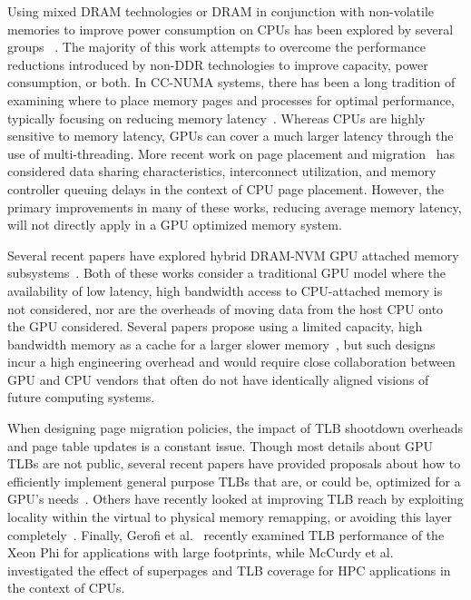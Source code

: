 Using mixed DRAM technologies or DRAM in conjunction with non-volatile memories
to improve power consumption on CPUs has been explored by several groups
~\cite{Kultursay2013,Phadke11mlpaware2011,Mogul2009,Bheda2011,Ramos2011}.
The majority of this work attempts to overcome the performance reductions introduced
by non-DDR technologies to improve capacity, power consumption, or both.
In CC-NUMA systems, there has been a long tradition of examining where to place
memory pages and processes for optimal performance, typically focusing on reducing
memory latency~\cite{Wilson2001,Bolosky1989,Brecht1993,LaRowe1992,Verghese1996,Iyer1998}.
Whereas CPUs are highly sensitive to memory latency, GPUs can cover a much larger latency
through the use of multi-threading.  More recent work on page placement and 
migration~\cite{AUTONUMA,Dashti2013,Tam2007,Zhuravlev2010,Knauerhase2008,Blagodurov2011,awasthinellans10}
has considered data sharing characteristics, interconnect utilization, and memory controller
queuing delays in the context of CPU page placement. However, the primary improvements in many of these works,
reducing average memory latency, will not directly apply in a GPU optimized memory system.

Several recent papers have explored hybrid DRAM-NVM GPU attached memory subsystems~\cite{zhao2013,Wang2013}.
Both of these works consider a traditional GPU model where the availability of low latency, high bandwidth access to CPU-attached 
memory is not considered, nor are the overheads of moving data from the host CPU onto the GPU considered.
Several papers propose using a limited capacity, high bandwidth memory as a
cache for a larger slower memory~\cite{jiang2011,Meza2012}, but such designs incur a high engineering
overhead and would require close collaboration between GPU and CPU vendors that often do not
have identically aligned visions of future computing systems.

When designing page migration policies, the impact of TLB shootdown overheads and page table updates is a constant
issue.  Though most details about GPU TLBs are not public,
several recent papers have provided proposals about how to efficiently implement general purpose TLBs
that are, or could be, optimized for a GPU's needs~\cite{Pichai2014,Villavieja2011,Power2014}. Others
have recently looked at improving TLB reach by exploiting locality within the virtual to physical
memory remapping, or avoiding this layer completely~\cite{swansonstoller98,Pham2014,Basu2013}.  
Finally, Gerofi et al.~\cite{Gerofi2014} recently examined TLB performance of the Xeon Phi
for applications with large footprints, while McCurdy et al.~\cite{McCurdy2008} investigated the
effect of superpages and TLB coverage for HPC applications in the context of CPUs.
